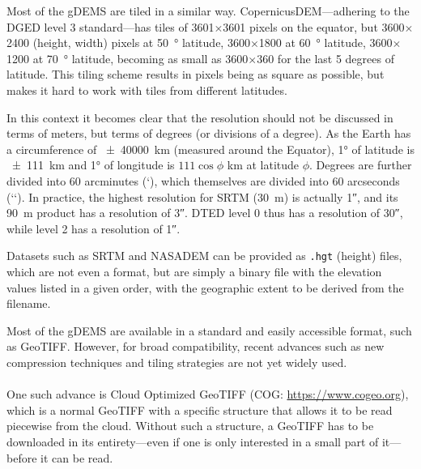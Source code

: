 %
Most of the gDEMS are tiled in a similar way.
CopernicusDEM---adhering to the DGED level 3 standard---has tiles of 3601$\times$3601 pixels on the equator, but 3600$\times$2400 (height, width) pixels at \qty{50}{\degree} latitude, 3600$\times$1800 at \qty{60}{\degree} latitude, 3600$\times$1200 at \qty{70}{\degree} latitude, becoming as small as 3600$\times$360 for the last 5 degrees of latitude.
This tiling scheme results in pixels being as square as possible, but makes it hard to work with tiles from different latitudes.

In this context it becomes clear that the resolution should not be discussed in terms of meters, but terms of degrees (or divisions of a degree).
As the Earth has a circumference of \qty{\pm40000}{km} (measured around the Equator), \ang{1} of latitude is \qty{\pm111}{km} and \ang{1} of longitude is $111\cos\phi$ \unit{km} at latitude $\phi$.
Degrees are further divided into 60 arcminutes (\lq), which themselves are divided into 60 arcseconds (\lq\lq).
In practice, the highest resolution for SRTM (\qty{30}{m}) is actually \ang{;;1}, and its \qty{90}{m} product has a resolution of \ang{;;3}.
DTED level 0 thus has a resolution of \ang{;;30}, while level 2 has a resolution of \ang{;;1}.
%

Datasets such as SRTM and NASADEM can be provided as \texttt{.hgt} (height) files, which are not even a format, but are simply a binary file with the elevation values listed in a given order, with the geographic extent to be derived from the filename.


\begin{floatbox}
\begin{kaobox-practice}[frametitle=\faCog\ Downloading gDEMs]
Most of the gDEMS are available in a standard and easily accessible format, such as GeoTIFF\@.
However, for broad compatibility, recent advances such as new compression techniques and tiling strategies are not yet widely used.
\\ \\
One such advance is Cloud Optimized GeoTIFF (COG: \url{https://www.cogeo.org}), which is a normal GeoTIFF with a specific structure that allows it to be read piecewise from the cloud.
Without such a structure, a GeoTIFF has to be downloaded in its entirety---even if one is only interested in a small part of it---before it can be read.
\end{kaobox-practice}
\end{floatbox}

